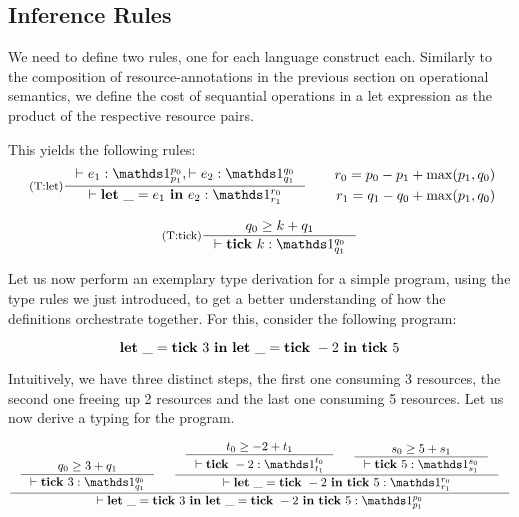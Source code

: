 \subsection{Inference Rules}

We need to define two rules, one for each language construct each. Similarly to the composition of resource-annotations in the previous section on operational semantics, we define the cost of sequantial operations in a let expression as the product of the respective resource pairs.

This yields the following rules:
\[
   \label{def:tr-let-4}
   \vcenter{\hbox{
      \inference[(T:let)]
      {\typing{}{e_1}{\ratype{\unit}{p_0}{p_1}},  \typing{}{e_2}{\ratype{\unit}{q_0}{q_1}}}
      {\typing{}{\letexp{\_}{e_1}{e_2}}{\ratype{\unit}{r_0}{r_1}}}
}}\qquad \begin{aligned}
      r_0 = p_0 - p_1 + \max(p_1, q_0) \\
      r_1 = q_1 - q_0 + \max(p_1, q_0)
   \end{aligned}
\]


\[
   \label{def:tr-tick-4}
   \inference[(T:tick)]
   {q_0 \geq k + q_1}
   {\typing{}{\tick{k}}{\ratype{\unit}{q_0}{q_1}}}
\]


Let us now perform an exemplary type derivation for a simple program, using the type rules we just introduced, to get a better understanding of how the definitions orchestrate together. For this, consider the following program:

\begin{example}

\[
   \mathbf{let}~\_ = \mathbf{tick}~3~\mathbf{in}~\mathbf{let}~\_ = \mathbf{tick}~-2~\mathbf{in}~\mathbf{tick}~5
\]

\end{example}

Intuitively, we have three distinct steps, the first one consuming 3 resources, the second one freeing up 2 resources and the last one consuming 5 resources. Let us now derive a typing for the program.

\[
   \inference
   {
      \inference
      {q_0 \geq 3 + q_1}
      {\typing{}{\tick{3}}{\ratype{\unit}{q_0}{q_1}}}
       &
      \inference
      {
         \inference
         {t_0 \geq -2 + t_1}
         {\typing{}{\tick{-2}}{\ratype{\unit}{t_0}{t_1}}}
          &
         \inference
         {s_0 \geq 5 + s_1}
         {\typing{}{\tick{5}}{\ratype{\unit}{s_0}{s_1}}}
      }
      {\typing{}{\letexp{\_}{\tick{-2}}{\tick{5}}}{\ratype{\unit}{r_0}{r_1}}}
   }
   {\typing{}{\letexp{\_}{\tick{3}}{\letexp{\_}{\tick{-2}}{\tick{5}}}}{\ratype{\unit}{p_0}{p_1}}}
\]

